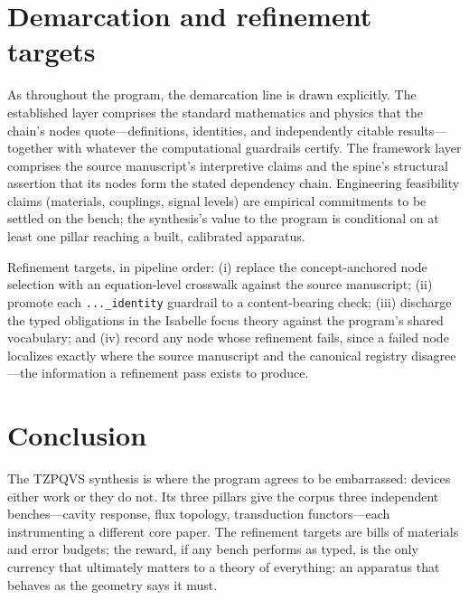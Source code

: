 \documentclass[11pt]{article}
\theoremstyle{remark}
\begin{document}
\section{Demarcation and refinement targets}
\label{sec:demarc}

As throughout the program, the demarcation line is drawn explicitly. The established layer comprises the standard mathematics and physics that the chain's nodes quote---definitions, identities, and independently citable results---together with whatever the computational guardrails certify. The framework layer comprises the source manuscript's interpretive claims and the spine's structural assertion that its nodes form the stated dependency chain. Engineering feasibility claims (materials, couplings, signal levels) are empirical commitments to be settled on the bench; the synthesis's value to the program is conditional on at least one pillar reaching a built, calibrated apparatus.

Refinement targets, in pipeline order: (i) replace the concept-anchored node selection with an equation-level crosswalk against the source manuscript; (ii) promote each \texttt{...\_identity} guardrail to a content-bearing check; (iii) discharge the typed obligations in the Isabelle focus theory against the program's shared vocabulary; and (iv) record any node whose refinement fails, since a failed node localizes exactly where the source manuscript and the canonical registry disagree---the information a refinement pass exists to produce.

\section{Conclusion}
\label{sec:conc}

The TZPQVS synthesis is where the program agrees to be embarrassed: devices either work or they do not. Its three pillars give the corpus three independent benches---cavity response, flux topology, transduction functors---each instrumenting a different core paper. The refinement targets are bills of materials and error budgets; the reward, if any bench performs as typed, is the only currency that ultimately matters to a theory of everything: an apparatus that behaves as the geometry says it must.
\end{document}
